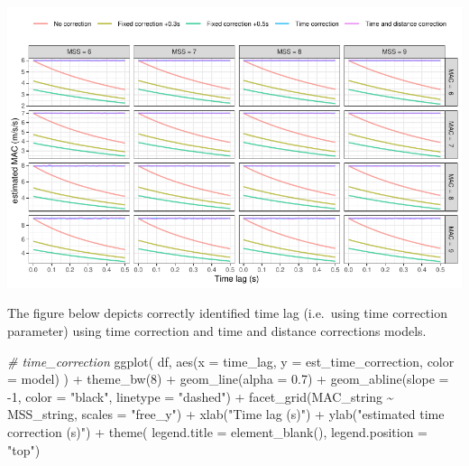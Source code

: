 \documentclass[fleqn,10pt,lineno]{wlpeerj} %
\newenvironment{Shaded}{\begin{snugshade}}{\end{snugshade}}
\newcommand{\AttributeTok}[1]{\textcolor[rgb]{0.77,0.63,0.00}{#1}}
\newcommand{\CommentTok}[1]{\textcolor[rgb]{0.56,0.35,0.01}{\textit{#1}}}
\newcommand{\DecValTok}[1]{\textcolor[rgb]{0.00,0.00,0.81}{#1}}
\newcommand{\FloatTok}[1]{\textcolor[rgb]{0.00,0.00,0.81}{#1}}
\newcommand{\FunctionTok}[1]{\textcolor[rgb]{0.00,0.00,0.00}{#1}}
\newcommand{\NormalTok}[1]{#1}
\newcommand{\SpecialCharTok}[1]{\textcolor[rgb]{0.00,0.00,0.00}{#1}}
\newcommand{\StringTok}[1]{\textcolor[rgb]{0.31,0.60,0.02}{#1}}
\begin{document}
\begin{center}\includegraphics[width=1\linewidth]{paper_files/figure-latex/unnamed-chunk-51-1} \end{center}

The figure below depicts correctly identified time lag (i.e.~using time correction parameter) using time correction and time and distance corrections models.

\begin{Shaded}
\begin{Highlighting}[]
\CommentTok{\# time\_correction}
\FunctionTok{ggplot}\NormalTok{(}
\NormalTok{  df,}
  \FunctionTok{aes}\NormalTok{(}\AttributeTok{x =}\NormalTok{ time\_lag, }\AttributeTok{y =}\NormalTok{ est\_time\_correction, }\AttributeTok{color =}\NormalTok{ model)}
\NormalTok{) }\SpecialCharTok{+}
  \FunctionTok{theme\_bw}\NormalTok{(}\DecValTok{8}\NormalTok{) }\SpecialCharTok{+}
  \FunctionTok{geom\_line}\NormalTok{(}\AttributeTok{alpha =} \FloatTok{0.7}\NormalTok{) }\SpecialCharTok{+}
  \FunctionTok{geom\_abline}\NormalTok{(}\AttributeTok{slope =} \SpecialCharTok{{-}}\DecValTok{1}\NormalTok{, }\AttributeTok{color =} \StringTok{"black"}\NormalTok{, }\AttributeTok{linetype =} \StringTok{"dashed"}\NormalTok{) }\SpecialCharTok{+}
  \FunctionTok{facet\_grid}\NormalTok{(MAC\_string }\SpecialCharTok{\textasciitilde{}}\NormalTok{ MSS\_string, }\AttributeTok{scales =} \StringTok{"free\_y"}\NormalTok{) }\SpecialCharTok{+}
  \FunctionTok{xlab}\NormalTok{(}\StringTok{"Time lag (s)"}\NormalTok{) }\SpecialCharTok{+}
  \FunctionTok{ylab}\NormalTok{(}\StringTok{"estimated time correction (s)"}\NormalTok{) }\SpecialCharTok{+}
  \FunctionTok{theme}\NormalTok{(}
    \AttributeTok{legend.title =} \FunctionTok{element\_blank}\NormalTok{(),}
    \AttributeTok{legend.position =} \StringTok{"top"}\NormalTok{)}
\end{Highlighting}
\end{Shaded}
\end{document}
